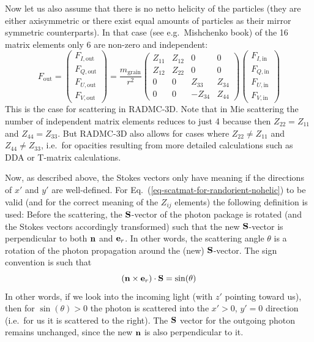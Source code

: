 \documentclass{report}
\begin{document}
Now let us also assume that there is no netto helicity of the particles
(they are either axisymmetric or there exist equal amounts of particles
as their mirror symmetric counterparts). In that case (see e.g.\ 
Mishchenko book) of the 16 matrix elements only 6 are non-zero and independent:
\begin{equation}
F_{\mathrm{out}} = \left(\begin{matrix}
F_{I,\mathrm{out}}\\
F_{Q,\mathrm{out}}\\
F_{U,\mathrm{out}}\\
F_{V,\mathrm{out}}
\end{matrix}\right)
=\frac{m_{\mathrm{grain}}}{r^2}
\left(\begin{matrix}
Z_{11} & Z_{12} & 0 & 0 \\
Z_{12} & Z_{22} & 0 & 0 \\
0 & 0 & Z_{33} & Z_{34} \\
0 & 0 & -Z_{34} & Z_{44}
\end{matrix}\right)
\left(\begin{matrix}
F_{I,\mathrm{in}}\\
F_{Q,\mathrm{in}}\\
F_{U,\mathrm{in}}\\
F_{V,\mathrm{in}}
\end{matrix}\right)
\label{eq-scatmat-for-randorient-nohelic}
\end{equation}
This is the case for scattering in RADMC-3D. Note that in Mie scattering
the number of independent matrix elements reduces to just 4 because 
then $Z_{22}=Z_{11}$ and $Z_{44}=Z_{33}$. But RADMC-3D also allows for
cases where $Z_{22}\neq Z_{11}$ and $Z_{44}\neq Z_{33}$, i.e.\ for
opacities resulting from more detailed calculations such as DDA or 
T-matrix calculations.

Now, as described above, the Stokes vectors only have meaning if the
directions of $x'$ and $y'$ are well-defined. For
Eq.~(\ref{eq-scatmat-for-randorient-nohelic}) to be valid (and for the
correct meaning of the $Z_{ij}$ elements) the following definition is used:
Before the scattering, the ${\bf S}$-vector of the photon package is rotated
(and the Stokes vectors accordingly transformed) such that the new ${\bf
  S}$-vector is perpendicular to both ${\bf n}$ and ${\bf e}_r$. In other
words, the scattering angle $\theta$ is a rotation of the photon propagation
around the (new) ${\bf S}$-vector. The sign convention is such that
\begin{equation}
({\bf n}\times {\bf e}_r)\cdot{\bf S}=\sin(\theta)
\end{equation}
In other words, if we look into the incoming light (with $z'$ pointing
toward us), then for $\sin(\theta)>0$ the photon is scattered into the
$x'>0$, $y'=0$ direction (i.e.\ for us it is scattered to the right).
The ${\bf S}$ vector for the outgoing photon remains unchanged, since
the new ${\bf n}$ is also perpendicular to it.
\end{document}
